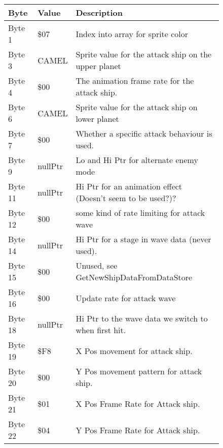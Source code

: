 \begin{figure}[H]
{\begin{adjustbox}{width=12cm}
\begin{tabular}{lll}
\toprule
 Byte    & Value                      & Description                                                        \\
\midrule
 Byte 1  & \$07                        & Index into array for sprite color                                  \\
 Byte 3  & CAMEL                      & Sprite value for the attack ship on the upper planet               \\
 Byte 4  & \$00                        & The animation frame rate for the attack ship.                      \\
 Byte 6  & CAMEL                      & Sprite value for the attack ship on lower planet                   \\
 Byte 7  & \$00                        & Whether a specific attack behaviour is used.                       \\
 Byte 9  & nullPtr                    & Lo and Hi Ptr for alternate enemy mode                             \\
 Byte 11 & nullPtr                    & Hi Ptr for an animation effect (Doesn't seem to be used?)?         \\
 Byte 12 & \$00                        & some kind of rate limiting for attack wave                         \\
 Byte 14 & nullPtr                    & Hi Ptr for a stage in wave data (never used).                      \\
 Byte 15 & \$00                        & Unused, see GetNewShipDataFromDataStore                            \\
 Byte 16 & \$00                        & Update rate for attack wave                                        \\
 Byte 18 & nullPtr                    & Hi Ptr to the wave data we switch to when first hit.               \\
 Byte 19 & \$F8                        & X Pos movement for attack ship.                                    \\
 Byte 20 & \$00                        & Y Pos movement pattern for attack ship.                            \\
 Byte 21 & \$01                        & X Pos Frame Rate for Attack ship.                                  \\
 Byte 22 & \$04                        & Y Pos Frame Rate for Attack ship.                                  \\

\end{tabular}
\end{adjustbox}}
\end{figure}
